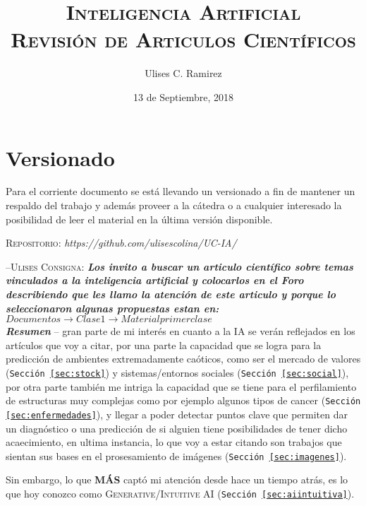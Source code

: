 \documentclass{article}
\title{\textsc{Inteligencia Artificial\\Revisi\'on de Articulos Cient\'ificos}}
\author{Ulises C. Ramirez}
\date{13 de Septiembre, 2018}
\begin{document}
\maketitle
{}
\newpage
\section*{Versionado}
Para el corriente documento se est\'a llevando un versionado a fin de mantener un respaldo del trabajo y adem\'as proveer a la c\'atedra o a cualquier interesado la posibilidad de leer el material en la \'ultima versi\'on disponible.\\

\begin{center}
  \textsc{Repositorio}: \textit{https://github.com/ulisescolina/UC-IA/}
\end{center}

\hfill--\textsc{Ulises}
\newpage
\textsc{Consigna}: \textit{\textbf{Los invito a buscar un articulo científico sobre temas vinculados a la inteligencia artificial y colocarlos en el Foro describiendo que les llamo la atención de este articulo y porque lo seleccionaron algunas propuestas estan en: $Documentos \rightarrow Clase1 \rightarrow Material primer clase$}}\\

\textit{\textbf{Resumen}} -- gran parte de mi inter\'es en cuanto a la IA se ver\'an reflejados en los art\'iculos que voy a citar, por una parte la capacidad que se logra para la predicci\'on de ambientes extremadamente ca\'oticos, como ser el mercado de valores (\texttt{Secci\'on \ref{sec:stock}}) y sistemas/entornos sociales (\texttt{Secci\'on \ref{sec:social}}), por otra parte tambi\'en me intriga la capacidad que se tiene para el perfilamiento de estructuras muy complejas como por ejemplo algunos tipos de cancer (\texttt{Secci\'on \ref{sec:enfermedades}}), y llegar a poder detectar puntos clave que permiten dar un diagn\'ostico o una predicci\'on de si alguien tiene posibilidades de tener dicho acaecimiento, en ultima instancia, lo que voy a estar citando son trabajos que sientan sus bases en el prosesamiento de im\'agenes (\texttt{Secci\'on \ref{sec:imagenes}}).

Sin embargo, lo que \textbf{M\'AS} capt\'o mi atenci\'on desde hace un tiempo atr\'as, es lo que hoy conozco como \textsc{Generative/Intuitive AI} (\texttt{Secci\'on \ref{sec:aiintuitiva}}).
\end{document}
